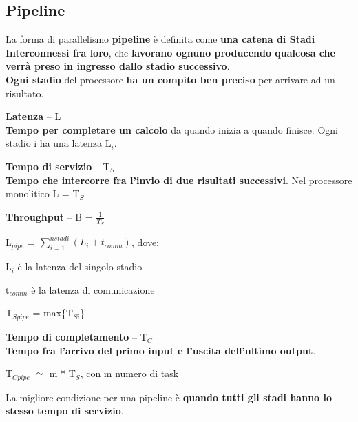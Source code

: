 \documentclass[10pt]{report}
\begin{document}
\subsection{Pipeline}
La forma di parallelismo \textbf{pipeline} è definita come \textbf{una catena di Stadi Interconnessi fra loro}, che \textbf{lavorano ognuno producendo qualcosa che verrà preso in ingresso dallo stadio successivo}.\\
\textbf{Ogni stadio} del processore \textbf{ha un compito ben preciso} per arrivare ad un risultato.\\
\begin{list}{}{Definiamo alcune \textbf{metriche} per capire quali sono le prestazioni di questa tecnica:}
	\item \textbf{Latenza} -- L\\
	\textbf{Tempo per completare un calcolo} da quando inizia a quando finisce. Ogni stadio i ha una latenza L$_i$.
	\item \textbf{Tempo di servizio} -- T$_S$\\
	\textbf{Tempo che intercorre fra l'invio di due risultati successivi}. Nel processore monolitico L = T$_S$
	\item \textbf{Throughput} -- B = $\frac{1}{T_S}$
	\item L$_{pipe}$ = $\sum_{i=1}^{n stadi} (L_i + t_{comm})$, dove:
	\begin{list}{}{}
		\item L$_i$ è la latenza del singolo stadio
		\item t$_{comm}$ è la latenza di comunicazione
	\end{list}
	\item T$_{Spipe}$ = max\{T$_{Si}$\}
	\item \textbf{Tempo di completamento} -- T$_C$\\
	\textbf{Tempo fra l'arrivo del primo input e l'uscita dell'ultimo output}.
	\item T$_{Cpipe}$ $\simeq$ m * T$_S$, con m numero di task
\end{list}
La migliore condizione per una pipeline è \textbf{quando tutti gli stadi hanno lo stesso tempo di servizio}.
\end{document}
